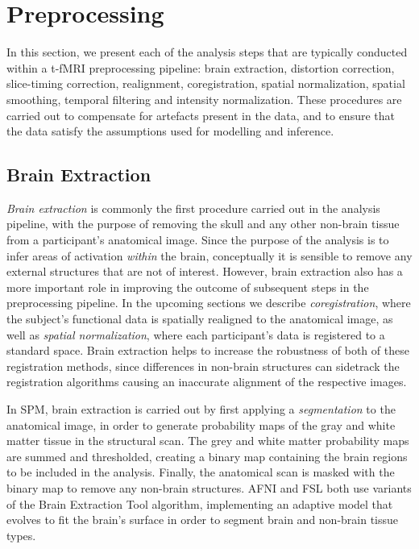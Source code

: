 \section{Preprocessing}

In this section, we present each of the analysis steps that are typically conducted within a t-fMRI preprocessing pipeline: brain extraction, distortion correction, slice-timing correction, realignment, coregistration, spatial normalization, spatial smoothing, temporal filtering and intensity normalization. These procedures are carried out to compensate for artefacts present in the data, and to ensure that the data satisfy the assumptions used for modelling and inference. 

\subsection{Brain Extraction}

\textit{Brain extraction} is commonly the first procedure carried out in the analysis pipeline, with the purpose of removing the skull and any other non-brain tissue from a participant's anatomical image. Since the purpose of the analysis is to infer areas of activation \textit{within} the brain, conceptually it is sensible to remove any external structures that are not of interest. However, brain extraction also has a more important role in improving the outcome of subsequent steps in the preprocessing pipeline. In the upcoming sections we describe \textit{coregistration}, where the subject's functional data is spatially realigned to the anatomical image, as well as \textit{spatial normalization}, where each participant's data is registered to a standard space. Brain extraction helps to increase the robustness of both of these registration methods, since differences in non-brain structures can sidetrack the registration algorithms causing an inaccurate alignment of the respective images. 

In SPM, brain extraction is carried out by first applying a \textit{segmentation} to the anatomical image, in order to generate probability maps of the gray and white matter tissue in the structural scan. The grey and white matter probability maps are summed and thresholded, creating a binary map containing the brain regions to be included in the analysis. Finally, the anatomical scan is masked with the binary map to remove any non-brain structures. AFNI and FSL both use variants of the Brain Extraction Tool \citep{Smith2002-vw} algorithm, implementing an adaptive model that evolves to fit the brain's surface in order to segment brain and non-brain tissue types. 

